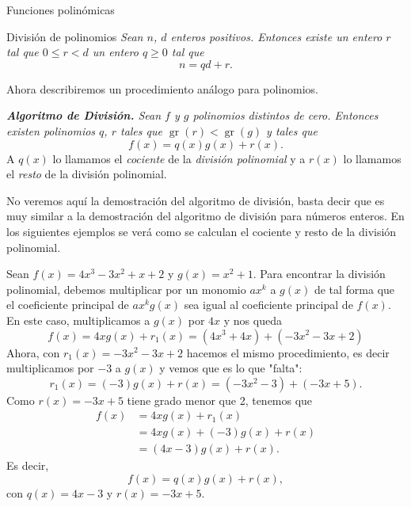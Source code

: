 \begin{chapter}{Funciones polin\'omicas}
\begin{section}{Divisi\'on de polinomios}
            \textit{Sean $n$, $d$ enteros positivos. Entonces existe un entero $r$ tal que
                $0 \le  r <d$  un entero $q \ge 0$ tal que
                } 
            \begin{equation*}
                n = qd + r.
            \end{equation*}
        
        Ahora describiremos un procedimiento análogo para polinomios.
    
        \textit{\textbf{Algoritmo de División.} Sean $f$ y $g$ polinomios distintos de cero. Entonces existen polinomios $q$, $r$ tales que $\operatorname{gr}(r) < \operatorname{gr}(g)$ y tales que}
        \begin{equation*}
            f (x) = q (x) g (x) + r (x).
        \end{equation*}
        A $q(x)$ lo llamamos el \textit{cociente} de la \textit{división polinomial} y  a $r(x)$ lo llamamos el \textit{resto}  de la división polinomial. 
        
        No veremos aquí la demostración del algoritmo de división, basta decir que es muy similar a  la demostración del algoritmo de división para números enteros. En los siguientes ejemplos se verá como se calculan el cociente y resto de la división polinomial. 
    
        \begin{ejemplo*} Sean $f(x) = 4x^3 - 3x^2 + x + 2$ y $g(x) = x^2 + 1$. Para encontrar la división polinomial, debemos multiplicar por un monomio $ax^k$ a $g(x)$ de tal forma que el coeficiente principal de  $ax^kg(x)$ sea igual al coeficiente principal de $f(x)$. En este caso, multiplicamos a $g(x)$ por $4x$ y nos queda 
        \begin{equation*}
            f(x) = 4xg(x) + r_1(x) = (4x^3 +4x)+(-3x^2-3x +2)
        \end{equation*}
        Ahora,  con $r_1(x)=-3x^2-3x +2$ hacemos el mismo procedimiento,  es decir multiplicamos por $-3$  a $g(x)$ y vemos que es lo que "falta":
        \begin{equation*}
            r_1(x) = (-3)g(x) +r(x) = (-3x^2 -3) + (-3x+5).
        \end{equation*}
        Como $r(x) = -3x+5$ tiene grado menor que 2, tenemos que
        \begin{align*}
        f(x) &= 4xg(x) + r_1(x)\\ &=4xg(x) + (-3)g(x) +r(x)\\& = (4x-3)g(x)+r(x).
        \end{align*}
        Es decir, 
        \begin{equation*}
        f(x) = q(x)g(x)+r(x),
        \end{equation*}
        con $q(x) =4x-3$ y $r(x) = -3x+5$. 
        

\end{ejemplo*}
\end{section}
\end{chapter}
